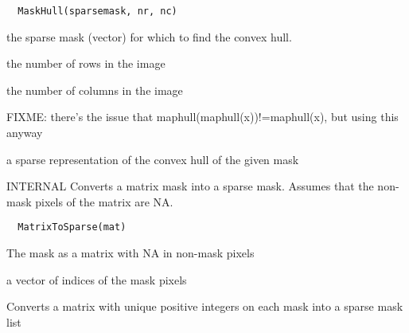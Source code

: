 \documentclass[a4paper]{book}
\begin{document}
%
\begin{Usage}
\begin{verbatim}
  MaskHull(sparsemask, nr, nc)
\end{verbatim}
\end{Usage}
%
\begin{Arguments}
\begin{ldescription}
\item[\code{sparsemask}] the sparse mask (vector) for which to
find the convex hull.

\item[\code{nr}] the number of rows in the image

\item[\code{nc}] the number of columns in the image
\end{ldescription}
\end{Arguments}
%
\begin{Details}\relax
FIXME: there's the issue that
maphull(maphull(x))!=maphull(x), but using this anyway
\end{Details}
%
\begin{Value}
a sparse representation of the convex hull of the given
mask
\end{Value}
%
\begin{Description}\relax
INTERNAL Converts a matrix mask into a sparse mask.
Assumes that the non-mask pixels of the matrix are NA.
\end{Description}
%
\begin{Usage}
\begin{verbatim}
  MatrixToSparse(mat)
\end{verbatim}
\end{Usage}
%
\begin{Arguments}
\begin{ldescription}
\item[\code{mat}] The mask as a matrix with NA in non-mask
pixels
\end{ldescription}
\end{Arguments}
%
\begin{Value}
a vector of indices of the mask pixels
\end{Value}
%
\begin{Description}\relax
Converts a matrix with unique positive integers on each
mask into a sparse mask list
\end{Description}
\end{document}
